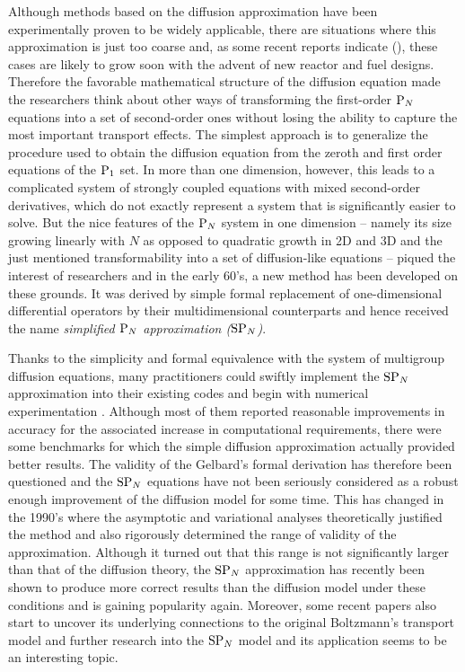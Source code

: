 Although methods based on the diffusion approximation have been experimentally proven to be widely applicable, there are situations where this approximation is just too coarse and, as some recent reports indicate (\cite{Hejzlar1,Cho1}), these cases are likely to grow soon with the advent of new reactor and fuel designs. Therefore the favorable mathematical structure of the diffusion equation made the researchers think about other ways of transforming the first-order $\PN$ equations into a set of second-order ones without losing the ability to capture the most important transport effects. The simplest approach is to generalize the procedure used to obtain the diffusion equation from the zeroth and first order equations of the $\PN[1]$ set. In more than one dimension, however, this leads to a complicated system of strongly coupled equations with mixed second-order derivatives, which do not exactly represent a system that is significantly easier to solve. But the nice features of the $\PN$ system in one dimension -- namely its size growing linearly with $N$ as opposed to quadratic growth in 2D and 3D and the just mentioned transformability into a set of diffusion-like equations -- piqued the interest of researchers and in the early 60's, a new method has been developed on these grounds. It was derived by simple formal replacement of one-dimensional differential operators by their multidimensional counterparts and hence received the name \textit{simplified $\PN$ approximation ($\SPN$)}.

Thanks to the simplicity and formal equivalence with the system of multigroup diffusion equations, many practitioners could swiftly implement the $\SPN$ approximation into their existing codes and begin with numerical experimentation . Although most of them reported reasonable improvements in accuracy for the associated increase in computational requirements, there were some benchmarks for which the simple diffusion approximation actually provided better results. The validity of the Gelbard's formal derivation has therefore been questioned and the $\SPN$ equations have not been seriously considered as a robust enough improvement of the diffusion model for some time. This has changed in the 1990's where the asymptotic and variational analyses theoretically justified the method and also rigorously determined the range of validity of the approximation. Although it turned out that this range is not significantly larger than that of the diffusion theory, the $\SPN$ approximation has recently been shown to produce more correct results than the diffusion model under these conditions and is gaining popularity again. Moreover, some recent papers also start to uncover its underlying connections to the original Boltzmann's transport model and further research into the $\SPN$ model and its application seems to be an interesting topic.

